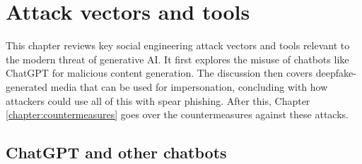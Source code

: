 



\chapter{Attack vectors and tools \label{chapter:attacks}}
\begin{comment}

Guides:
    - About 3-4 pages

TODO:
    [ ] 

What to cover:
    - Attacks
        - Deepfake generated synthetic media
            - Videos
            - Images
            - Audio
            - Real-time voice morphing

Sections:
    - Attack Vectors and Tools
        - Chatbots
        - Deepfake-generated media
        - Phishing & spear phishing

\end{comment}

This chapter reviews key social engineering attack vectors and tools relevant to the modern threat of generative AI. It first explores the misuse of chatbots like ChatGPT for malicious content generation. The discussion then covers deepfake-generated media that can be used for impersonation, concluding with how attackers could use all of this with spear phishing. After this, Chapter \ref{chapter:countermeasures} goes over the countermeasures against these attacks.














\section{ChatGPT and other chatbots}

\begin{comment}

What to cover:
    - Mitä ovat chatbotit kuten ChatGPT
    - How Generative AI can be used by both cybersecurity professionals and threat actors
    - Circumventing ChatGPT's ethical restrictions with, for example prompt injections attacks or reverse psychology (with at least 1-2 examples)
    - How scholars and regular users have found ways to bypass ChatGPT's ethical restrictions??
    - Tekoälyn päivitys kun löydetään uusia tapoja ohittaa sen eettiset ohjeistukset ja kehittäjien asettamat rajoitukset
    - Pyydetään tekoälyä roolipelaamaan social engineering skenaarioita
    - Kielioppi ja kirjoitusvirheiden korjaus scam viesteissä
    
\end{comment}


